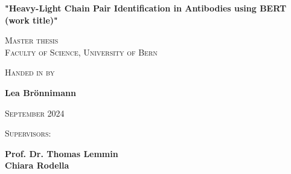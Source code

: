 \begin{titlepage}
  \centering
  {\huge\bfseries "Heavy-Light Chain Pair Identification in Antibodies using BERT (work title)" \par}
  \vspace{2cm}
   {\scshape\LARGE Master thesis \\ Faculty of Science,  University of Bern  \par}
  \vspace{1cm}
  {\scshape\Large Handed in by \par}
  \vspace{0cm}
  {\Large \textbf{Lea Br\"{o}nnimann} \par}
  \vfill
  {\Large \scshape September 2024 \par}
  \vspace{2cm}
  {\scshape\Large Supervisors: \par}
  \vspace{0cm}
  {\Large \textbf{Prof. Dr. Thomas Lemmin} \\ \textbf{Chiara Rodella}\par}
  \textbf{} \par
  \vfill
  \vfill
  \textbf{} \par
   \par
 \par
  \vfill

\end{titlepage}
